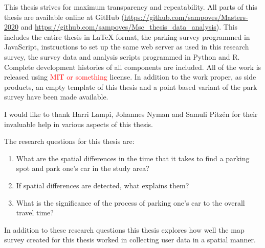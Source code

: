 This thesis strives for maximum transparency and repeatability. All parts of this thesis are available online at GitHub (\textcolor{blue}{\url{https://github.com/sampoves/Masters-2020}} and \textcolor{blue}{\url{https://github.com/sampoves/Msc_thesis_data_analysis}}). This includes the entire thesis in LaTeX format, the parking survey programmed in JavaScript, instructions to set up the same web server as used in this research survey, the survey data and analysis scripts programmed in Python and R. Complete development histories of all components are included. All of the work is released using \textcolor{red}{MIT or something} license. In addition to the work proper, as side products, an empty template of this thesis and a point based variant of the park survey have been made available.

I would like to thank Harri Lampi, Johannes Nyman and Samuli Pitzén for their invaluable help in various aspects of this thesis.

\bigskip
\noindent
The research questions for this thesis are:

\begin{spacing}{1}
\begin{enumerate}[label=\Roman*] %
  \item What are the spatial differences in the time that it takes to find a parking spot and park one’s car in the study area?
  \item If spatial differences are detected, what explains them?
  \item What is the significance of the process of parking one’s car to the overall travel time?
\end{enumerate}
\end{spacing}
\bigskip
In addition to these research questions this thesis explores how well the map survey created for this thesis worked in collecting user data in a spatial manner.